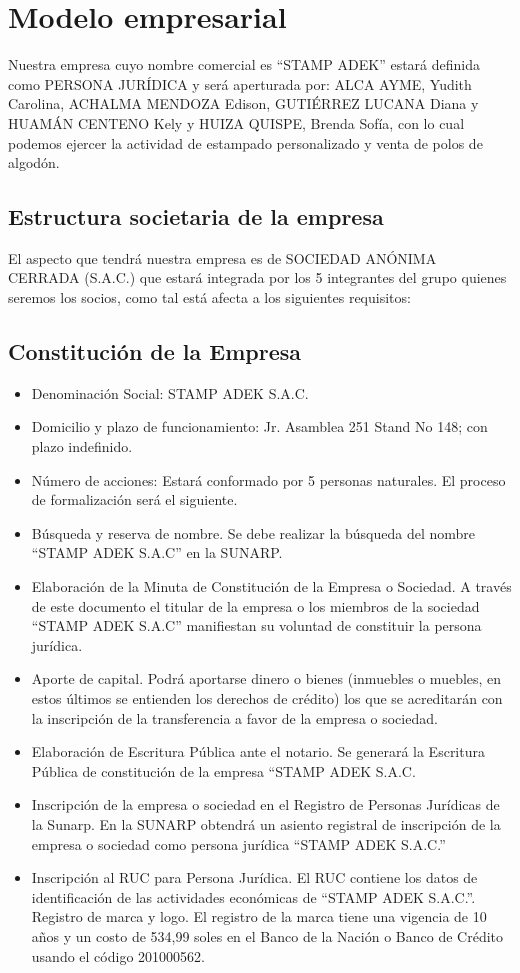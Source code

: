 \documentclass[a4paper,openright,12pt]{book}
\begin{document}
\section{Modelo empresarial}

Nuestra empresa cuyo nombre comercial es “STAMP ADEK” estará definida como PERSONA JURÍDICA y será aperturada por: ALCA AYME, Yudith Carolina, ACHALMA MENDOZA Edison, GUTIÉRREZ LUCANA Diana y HUAMÁN CENTENO Kely y HUIZA QUISPE, Brenda Sofía, con lo cual podemos ejercer la actividad de estampado personalizado y venta de polos de algodón.

\subsection{Estructura societaria de la empresa}
El aspecto que tendrá nuestra empresa es de SOCIEDAD ANÓNIMA CERRADA (S.A.C.) que estará integrada por los 5 integrantes del grupo quienes seremos los socios, como tal está afecta a los siguientes requisitos:

\subsection{Constitución de la Empresa}
\begin{itemize}
\item Denominación Social: STAMP ADEK S.A.C.
\item Domicilio y plazo de funcionamiento: Jr. Asamblea 251 Stand No 148; con plazo indefinido.
\item Número de acciones: Estará conformado por 5 personas naturales. El proceso de formalización será el siguiente.
\item Búsqueda y reserva de nombre. Se debe realizar la búsqueda del nombre “STAMP ADEK S.A.C” en la SUNARP.
\item Elaboración de la Minuta de Constitución de la Empresa o Sociedad. A través de este documento el titular de la empresa o los miembros de la sociedad “STAMP ADEK S.A.C” manifiestan su voluntad de constituir la persona jurídica.
\item Aporte de capital. Podrá aportarse dinero o bienes (inmuebles o muebles, en estos últimos se entienden los derechos de crédito) los que se acreditarán con la inscripción de la transferencia a favor de la empresa o sociedad.
\item Elaboración de Escritura Pública ante el notario. Se generará la Escritura Pública de constitución de la empresa “STAMP ADEK S.A.C.
\item Inscripción de la empresa o sociedad en el Registro de Personas Jurídicas de la Sunarp. En la SUNARP obtendrá un asiento registral de inscripción de la empresa o sociedad como persona jurídica “STAMP ADEK S.A.C.”
\item Inscripción al RUC para Persona Jurídica. El RUC contiene los datos de identificación de las actividades económicas de “STAMP ADEK S.A.C.”. Registro de marca y logo. El registro de la marca tiene una vigencia de 10 años y un costo de 534,99 soles en el Banco de la Nación o Banco de Crédito usando el código 201000562.
\end{itemize}
\end{document}
